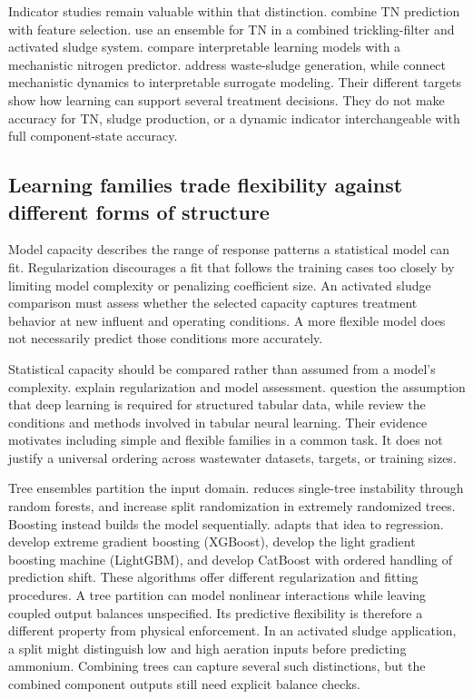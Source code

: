 Indicator studies remain valuable within that distinction. \citet{Bagherzadeh2021} combine TN prediction with feature selection. \citet{SadriMoghaddamMesghali2023} use an ensemble for TN in a combined trickling-filter and activated sludge system. \citet{Wang2025} compare interpretable learning models with a mechanistic nitrogen predictor. \citet{Yang2025} address waste-sludge generation, while \citet{Xiao2026} connect mechanistic dynamics to interpretable surrogate modeling. Their different targets show how learning can support several treatment decisions. They do not make accuracy for TN, sludge production, or a dynamic indicator interchangeable with full component-state accuracy.

\subsection{Learning families trade flexibility against different forms of structure}

Model capacity describes the range of response patterns a statistical model can fit. Regularization discourages a fit that follows the training cases too closely by limiting model complexity or penalizing coefficient size. An activated sludge comparison must assess whether the selected capacity captures treatment behavior at new influent and operating conditions. A more flexible model does not necessarily predict those conditions more accurately.

Statistical capacity should be compared rather than assumed from a model's complexity. \citet{Hastie2009} explain regularization and model assessment. \citet{ShwartzZiv2022} question the assumption that deep learning is required for structured tabular data, while \citet{Borisov2024} review the conditions and methods involved in tabular neural learning. Their evidence motivates including simple and flexible families in a common task. It does not justify a universal ordering across wastewater datasets, targets, or training sizes.

Tree ensembles partition the input domain. \citet{Breiman2001} reduces single-tree instability through random forests, and \citet{Geurts2006} increase split randomization in extremely randomized trees. Boosting instead builds the model sequentially. \citet{Drucker1997} adapts that idea to regression. \citet{ChenGuestrin2016} develop extreme gradient boosting (XGBoost), \citet{Ke2017} develop the light gradient boosting machine (LightGBM), and \citet{Prokhorenkova2018} develop CatBoost with ordered handling of prediction shift. These algorithms offer different regularization and fitting procedures. A tree partition can model nonlinear interactions while leaving coupled output balances unspecified. Its predictive flexibility is therefore a different property from physical enforcement. In an activated sludge application, a split might distinguish low and high aeration inputs before predicting ammonium. Combining trees can capture several such distinctions, but the combined component outputs still need explicit balance checks.

